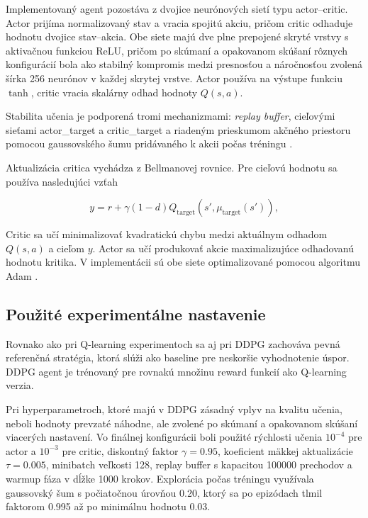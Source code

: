 \documentclass[conference]{IEEEtran}
\begin{document}
Implementovaný agent pozostáva z dvojice neurónových sietí typu actor--critic. Actor prijíma normalizovaný stav a vracia spojitú akciu, pričom critic odhaduje hodnotu dvojice stav--akcia. Obe siete majú dve plne prepojené skryté vrstvy s aktivačnou funkciou ReLU, pričom po skúmaní a opakovanom skúšaní rôznych konfigurácií bola ako stabilný kompromis medzi presnosťou a náročnosťou zvolená šírka 256 neurónov v každej skrytej vrstve. Actor používa na výstupe funkciu $\tanh$, critic vracia skalárny odhad hodnoty $Q(s,a)$.

Stabilita učenia je podporená tromi mechanizmami: \textit{replay buffer}, cieľovými sieťami actor\_target a critic\_target a riadeným prieskumom akčného priestoru pomocou gaussovského šumu pridávaného k akcii počas tréningu \cite{b14}.

Aktualizácia critica vychádza z Bellmanovej rovnice. Pre cieľovú hodnotu sa používa nasledujúci vzťah

\begin{equation}
y = r + \gamma (1-d)Q_{\text{target}}\left(s',\mu_{\text{target}}(s')\right),
\end{equation}

Critic sa učí minimalizovať kvadratickú chybu medzi aktuálnym odhadom $Q(s,a)$ a cieľom $y$. Actor sa učí produkovať akcie maximalizujúce odhadovanú hodnotu kritika. V implementácii sú obe siete optimalizované pomocou algoritmu Adam \cite{b16}.

\subsection{Použité experimentálne nastavenie}

Rovnako ako pri Q-learning experimentoch sa aj pri DDPG zachováva pevná referenčná stratégia, ktorá slúži ako baseline pre neskoršie vyhodnotenie úspor. DDPG agent je trénovaný pre rovnakú množinu reward funkcií ako Q-learning verzia.

Pri hyperparametroch, ktoré majú v DDPG zásadný vplyv na kvalitu učenia, neboli hodnoty prevzaté náhodne, ale zvolené po skúmaní a opakovanom skúšaní viacerých nastavení. Vo finálnej konfigurácii boli použité rýchlosti učenia $10^{-4}$ pre actor a $10^{-3}$ pre critic, diskontný faktor $\gamma = 0.95$, koeficient mäkkej aktualizácie $\tau = 0.005$, minibatch veľkosti 128, replay buffer s kapacitou 100000 prechodov a warmup fáza v dĺžke 1000 krokov. Explorácia počas tréningu využívala gaussovský šum s počiatočnou úrovňou 0.20, ktorý sa po epizódach tlmil faktorom 0.995 až po minimálnu hodnotu 0.03.
\end{document}
